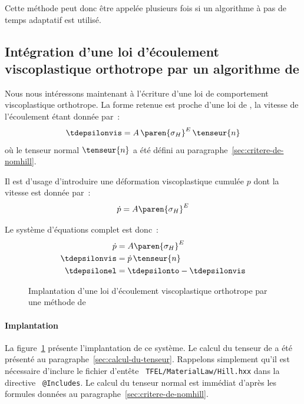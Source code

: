 \documentclass[rectoverso,pleiades,pstricks,leqno,anti]{texmf/note_technique_2010}
\newcommand{\sigmaH}{\ensuremath{\sigma_{H}}}
\newcommand{\code}[1]{
  \psframebox[linecolor=ceaorange,shadow=true,blur=true]{
    \begin{minipage}[htbp]{1.0\linewidth}
      \ttfamily\scriptsize #1
    \end{minipage}
  }
}
\begin{document}
Cette méthode peut donc être appelée plusieurs fois si un algorithme à
pas de temps adaptatif est utilisé.

\subsection{Intégration d'une loi d'écoulement viscoplastique
  orthotrope par un algorithme de }

Nous nous intéressons maintenant à l'écriture d'une loi de
comportement viscoplastique orthotrope. La forme retenue est proche
d'une loi de , la vitesse de l'écoulement étant donnée
par~:
\[
\tdepsilonvis = A\,\paren{\sigmaH}^{E}\,\tenseur{n}
\]
où le tenseur normal \(\tenseur{n}\) a été défini au
paragraphe~\ref{sec:critere-de-nomhill}.

Il est d'usage d'introduire une déformation viscoplastique cumulée
\(p\) dont la vitesse est donnée par~:
\[
\dot{p} = A\paren{\sigmaH}^{E}
\]

Le système d'équations complet est donc~:
\begin{equation}
  \label{eq:law}
  \begin{aligned}
    \dot{p}       &= A\paren{\sigmaH}^{E} \\
    \tdepsilonvis &= \dot{p}\,\tenseur{n}   \\
    \tdepsilonel  &= \tdepsilonto - \tdepsilonvis
  \end{aligned}
\end{equation}

\begin{figure}[htbp]
  \centering
  \begin{minipage}[htbp]{0.9\linewidth}
    \shorthandoff{:}
    \code{
      \small
      
    }
    \shorthandon{:}
  \end{minipage}
  \caption{Implantation d'une loi d'écoulement viscoplastique
    orthotrope par une mé\-tho\-de de }
  \label{fig:OrthoViscoRK}
\end{figure}

\paragraph{Implantation} La figure~\ref{fig:OrthoViscoRK} présente
l'implantation de ce système. Le calcul du tenseur de  a été
présenté au paragraphe~\ref{sec:calcul-du-tenseur}. Rappelons
simplement qu'il est nécessaire d'inclure le fichier d'entête {\tt
  TFEL/\-Material\-Law/\-Hill.hxx} dans la directive {\tt
  @Includes}. Le calcul du tenseur normal est immédiat d'après les
formules données au paragraphe~\ref{sec:critere-de-nomhill}.
\end{document}
